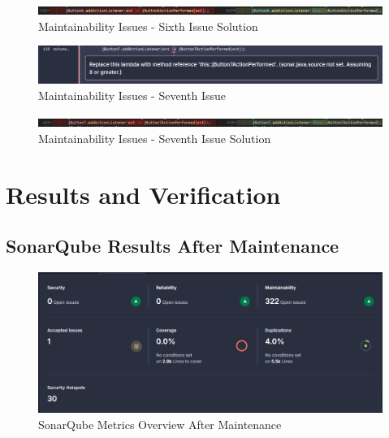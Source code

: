 \documentclass[12pt,a4paper]{article}
\begin{document}
\begin{figure}[H]
    \centering
    \includegraphics[width=1\textwidth]{AbdouPhotos/Maintainability/jButton6Solution.png}
    \caption{Maintainability Issues - Sixth Issue Solution}
    \label{fig:MI-6thS}
\end{figure}
\begin{figure}[H]
    \centering
    \includegraphics[width=1\textwidth]{AbdouPhotos/Maintainability/jButton7.png}
    \caption{Maintainability Issues - Seventh Issue}
    \label{fig:MI-7th}
\end{figure}
\begin{figure}[H]
    \centering
    \includegraphics[width=1\textwidth]{AbdouPhotos/Maintainability/jButton7Solution.png}
    \caption{Maintainability Issues - Seventh Issue Solution}
    \label{fig:MI-7thS}
\end{figure}
\section{Results and Verification}
\subsection{SonarQube Results After Maintenance}

\begin{figure}[H]
    \centering
    \includegraphics[width=1\textwidth]{AbdouPhotos/Maintainability/ResultAfter.png}
    \caption{SonarQube Metrics Overview After Maintenance}
    \label{fig:SMO-A}
\end{figure}
\end{document}
